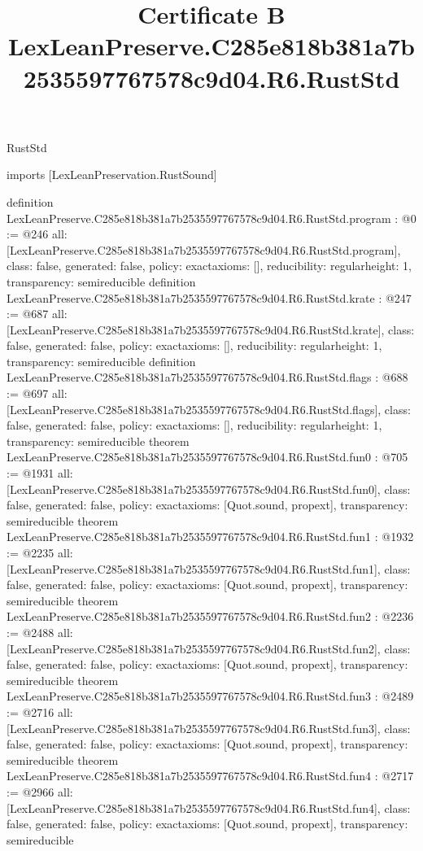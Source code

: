 \begin{lexlean}{RustStd}
\title{Certificate B LexLeanPreserve.C285e818b381a7b2535597767578c9d04.R6.RustStd}
\begin{coremodule}
imports [LexLeanPreservation.RustSound]

definition LexLeanPreserve.C285e818b381a7b2535597767578c9d04.R6.RustStd.program : @0 := @246 {
  all: [LexLeanPreserve.C285e818b381a7b2535597767578c9d04.R6.RustStd.program],
  class: false,
  generated: false,
  policy: exact{axioms: []},
  reducibility: regular{height: 1},
  transparency: semireducible
}
definition LexLeanPreserve.C285e818b381a7b2535597767578c9d04.R6.RustStd.krate : @247 := @687 {
  all: [LexLeanPreserve.C285e818b381a7b2535597767578c9d04.R6.RustStd.krate],
  class: false,
  generated: false,
  policy: exact{axioms: []},
  reducibility: regular{height: 1},
  transparency: semireducible
}
definition LexLeanPreserve.C285e818b381a7b2535597767578c9d04.R6.RustStd.flags : @688 := @697 {
  all: [LexLeanPreserve.C285e818b381a7b2535597767578c9d04.R6.RustStd.flags],
  class: false,
  generated: false,
  policy: exact{axioms: []},
  reducibility: regular{height: 1},
  transparency: semireducible
}
theorem LexLeanPreserve.C285e818b381a7b2535597767578c9d04.R6.RustStd.fun0 : @705 := @1931 {
  all: [LexLeanPreserve.C285e818b381a7b2535597767578c9d04.R6.RustStd.fun0],
  class: false,
  generated: false,
  policy: exact{axioms: [Quot.sound, propext]},
  transparency: semireducible
}
theorem LexLeanPreserve.C285e818b381a7b2535597767578c9d04.R6.RustStd.fun1 : @1932 := @2235 {
  all: [LexLeanPreserve.C285e818b381a7b2535597767578c9d04.R6.RustStd.fun1],
  class: false,
  generated: false,
  policy: exact{axioms: [Quot.sound, propext]},
  transparency: semireducible
}
theorem LexLeanPreserve.C285e818b381a7b2535597767578c9d04.R6.RustStd.fun2 : @2236 := @2488 {
  all: [LexLeanPreserve.C285e818b381a7b2535597767578c9d04.R6.RustStd.fun2],
  class: false,
  generated: false,
  policy: exact{axioms: [Quot.sound, propext]},
  transparency: semireducible
}
theorem LexLeanPreserve.C285e818b381a7b2535597767578c9d04.R6.RustStd.fun3 : @2489 := @2716 {
  all: [LexLeanPreserve.C285e818b381a7b2535597767578c9d04.R6.RustStd.fun3],
  class: false,
  generated: false,
  policy: exact{axioms: [Quot.sound, propext]},
  transparency: semireducible
}
theorem LexLeanPreserve.C285e818b381a7b2535597767578c9d04.R6.RustStd.fun4 : @2717 := @2966 {
  all: [LexLeanPreserve.C285e818b381a7b2535597767578c9d04.R6.RustStd.fun4],
  class: false,
  generated: false,
  policy: exact{axioms: [Quot.sound, propext]},
  transparency: semireducible
}
\end{coremodule}
\end{lexlean}
